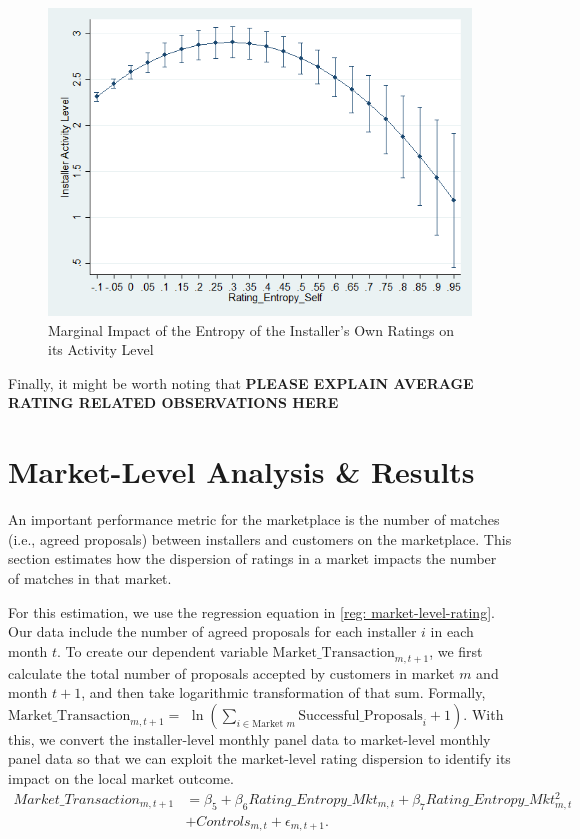 \documentclass[msom,blindrev]{informs3}
\begin{document}
\begin{figure}
	\centering
	\includegraphics[width=0.7\linewidth]{marginsplot_entself.png}
	\caption{Marginal Impact of the Entropy of the Installer's Own Ratings on its Activity Level}
	\label{fig: marginsplot_ind_ent_self}
\end{figure}


Finally, it might be worth noting that \textbf{PLEASE EXPLAIN AVERAGE RATING RELATED OBSERVATIONS HERE}

\section{Market-Level Analysis \& Results} \label{Sec: Market-level}

An important performance metric for the marketplace is the number of matches (i.e., agreed proposals) between installers and customers on the marketplace. This section estimates how the dispersion of ratings in a market impacts the number of matches in that market.

For this estimation, we use the regression equation in \eqref{reg: market-level-rating}. Our data include the number of agreed proposals for each installer $i$ in each month $t$. To create our dependent variable $\text{Market\_Transaction}_{m,t+1}$, we first calculate the total number of proposals accepted by customers in market $m$ and month $t+1$, and then take logarithmic transformation of that sum. Formally, $\text{Market\_Transaction}_{m,t+1} =$ $\ln\left( \sum_{i \in \text{Market\ } m} \text{Successful\_Proposals}_{i}+ 1 \right)$.  With this, we convert the installer-level monthly panel data to market-level monthly panel data so that we can exploit the market-level rating dispersion to identify its impact on the local market outcome.
\begin{align} \nonumber
   Market\_Transaction_{m,t+1} & =\beta_{5} + \beta_{6} Rating\_Entropy\_Mkt_{m,t}+ \beta_{7} Rating\_Entropy\_Mkt_{m,t} ^2\\ \label{reg: market-level-rating}
   &+ Controls_{m,t}  +\epsilon_{m,t+1}.
\end{align}
\end{document}
